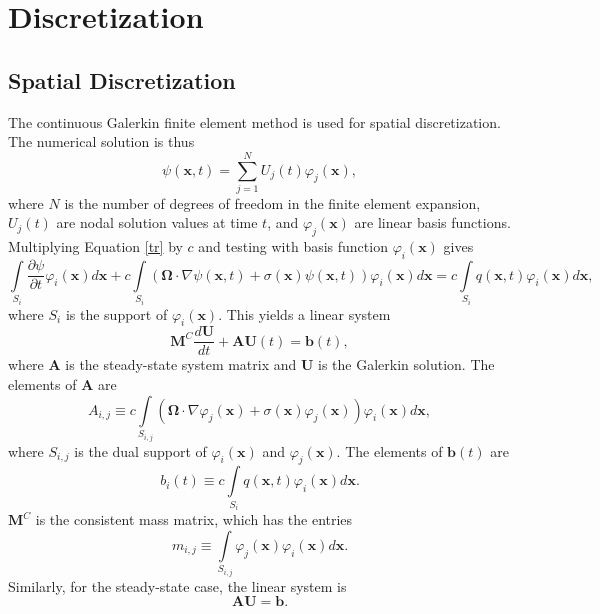 \section{Discretization}
\subsection{Spatial Discretization}\label{galerkindef}
The continuous Galerkin finite element method is used for spatial discretization.
The numerical solution is thus
\begin{equation}
   \psi(\mathbf{x},t) = \sum\limits_{j=1}^N U_j(t) \varphi_j(\mathbf{x}),
\end{equation}
where $N$ is the number of degrees of freedom in the finite element expansion,
$U_j(t)$ are nodal solution values at time $t$, and $\varphi_j(\mathbf{x})$
are linear basis functions. Multiplying Equation \eqref{tr} by $c$ and testing
with basis function $\varphi_i(\mathbf{x})$ gives
\begin{equation}
   \int\limits_{S_i}\frac{\partial \psi}{\partial t}\varphi_i(\mathbf{x}) d\mathbf{x}
      + c\int\limits_{S_i}\left(\mathbf{\Omega}\cdot\nabla\psi(\mathbf{x},t)
      + \sigma(\mathbf{x})\psi(\mathbf{x},t)\right)\varphi_i(\mathbf{x}) d\mathbf{x}
      = c\int\limits_{S_i} q(\mathbf{x},t) \varphi_i(\mathbf{x}) d\mathbf{x},
\end{equation}
where $S_i$ is the support of $\varphi_i(\mathbf{x})$.
This yields a linear system
\begin{equation}\label{semidiscrete}
   \mathbf{M}^C\frac{d\mathbf{U}}{dt}+\mathbf{A} \mathbf{U}(t) = \mathbf{b}(t),
\end{equation}
where $\mathbf{A}$ is the steady-state system matrix and $\mathbf{U}$ is the
Galerkin solution. The elements of $\mathbf{A}$ are
\begin{equation}\label{Aij}
	A_{i,j} \equiv c\int\limits_{S_{i,j}}\left(
      \mathbf{\Omega}\cdot\nabla\varphi_j(\mathbf{x}) +
		\sigma(\mathbf{x})\varphi_j(\mathbf{x})\right)\varphi_i(\mathbf{x}) d\mathbf{x},
\end{equation}
where $S_{i,j}$ is the dual support of $\varphi_i(\mathbf{x})$ and $\varphi_j(\mathbf{x})$.
The elements of $\mathbf{b}(t)$ are
\begin{equation}
	b_i(t) \equiv c\int\limits_{S_i} q(\mathbf{x},t)\varphi_i(\mathbf{x}) d\mathbf{x}.
\end{equation}
$\mathbf{M}^C$ is the consistent mass matrix, which has the entries
\begin{equation}\label{massmatrix}
	m_{i,j} \equiv \int\limits_{S_{i,j}}
   \varphi_j(\mathbf{x})\varphi_i(\mathbf{x}) d\mathbf{x}.
\end{equation}
Similarly, for the steady-state case, the linear system is
\begin{equation}
  \mathbf{A}\mathbf{U} = \mathbf{b}.
\end{equation}

